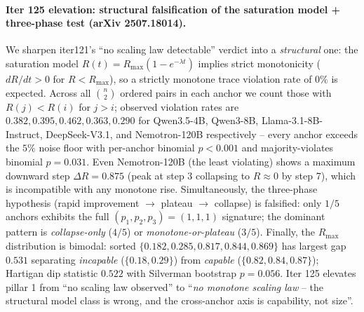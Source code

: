 \paragraph{Iter 125 elevation: structural falsification of the saturation model + three-phase test (arXiv 2507.18014).}
\label{par:scaling-iter125}
We sharpen iter121's ``no scaling law detectable'' verdict into a
\emph{structural} one: the saturation model
$R(t) = R_{\max}(1 - e^{-\lambda t})$ implies strict monotonicity
($dR/dt > 0$ for $R < R_{\max}$), so a strictly monotone trace
violation rate of $0\%$ is expected.  Across all $\binom{n}{2}$
ordered pairs in each anchor we count those with $R(j) < R(i)$
for $j > i$; observed violation rates are $0.382, 0.395, 0.462,
0.363, 0.290$ for Qwen3.5-4B, Qwen3-8B, Llama-3.1-8B-Instruct,
DeepSeek-V3.1, and Nemotron-120B respectively -- every anchor
exceeds the $5\%$ noise floor with per-anchor binomial $p < 0.001$
and majority-violates binomial $p = 0.031$.  Even Nemotron-120B
(the least violating) shows a maximum downward step
$\Delta R = 0.875$ (peak at step 3 collapsing to $R \approx 0$
by step 7), which is incompatible with any monotone rise.
Simultaneously, the three-phase hypothesis
\citep{arXiv2507.18014} (rapid improvement $\to$ plateau $\to$
collapse) is falsified: only $1/5$ anchors exhibits the full
$(p_1, p_2, p_3) = (1, 1, 1)$ signature; the dominant pattern is
\emph{collapse-only} ($4/5$) or \emph{monotone-or-plateau}
($3/5$).  Finally, the $R_{\max}$ distribution is bimodal:
sorted $\{0.182, 0.285, 0.817, 0.844, 0.869\}$ has largest gap
$0.531$ separating \emph{incapable} ($\{0.18, 0.29\}$) from
\emph{capable} ($\{0.82, 0.84, 0.87\}$); Hartigan dip statistic
$0.522$ with Silverman bootstrap $p = 0.056$.  Iter 125
elevates pillar 1 from ``no scaling law observed'' to ``\emph{no
monotone scaling law} -- the structural model class is wrong,
and the cross-anchor axis is capability, not size''.

